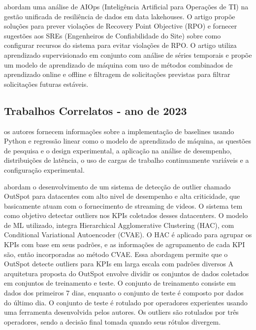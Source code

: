 \cite{10020986} abordam uma análise de AIOps (Inteligência Artificial para Operações de TI) na gestão unificada de resiliência de dados em data lakehouses. O artigo propõe soluções para prever violações de Recovery Point Objective  (RPO) e fornecer sugestões aos SREs (Engenheiros de Confiabilidade do Site) sobre como configurar recursos do sistema para evitar violações de RPO. O artigo utiliza aprendizado supervisionado em conjunto com análise de séries temporais e propõe um modelo de aprendizado de máquina com uso de métodos combinados de aprendizado online e offline e filtragem de solicitações previstas para filtrar solicitações futuras estáveis.


\subsection{Trabalhos Correlatos - ano de 2023}\label{trab_correlatos_23}


\cite{10098585} os autores fornecem informações sobre a implementação de baselines usando Python e regressão linear como o modelo de aprendizado de máquina, as questões de pesquisa e o design experimental, a aplicação na análise de desempenho, distribuições de latência, o uso de cargas de trabalho continuamente variáveis e a configuração experimental.

\cite{10113794} abordam o desenvolvimento de um sistema de detecção de outlier chamado OutSpot para datacentes com alto nivel de desempenho e alta criticidade, que basicamente atuam com o fornecimento de streaming de videos. O sistema tem como objetivo detectar outliers nos KPIs coletados desses datacenters.  O modelo de ML utilizado, integra Hierarchical Agglomerative Clustering (HAC), com Conditional Variational Autoencoder (CVAE). O HAC é aplicado para agrupar os KPIs com base em seus padrões, e as informações de agrupamento de cada KPI são, então incorporadas ao método CVAE. Essa abordagem permite que o OutSpot detecte outliers para KPIs em larga escala com padrões diversos A arquitetura proposta do OutSpot envolve dividir os conjuntos de dados coletados em conjuntos de treinamento e teste. O conjunto de treinamento consiste em dados dos primeiros 7 dias, enquanto o conjunto de teste é composto por dados do último dia. O conjunto de teste é rotulado por operadores experientes usando uma ferramenta desenvolvida pelos autores. Os outliers são rotulados por três operadores, sendo a decisão final tomada quando seus rótulos divergem.
